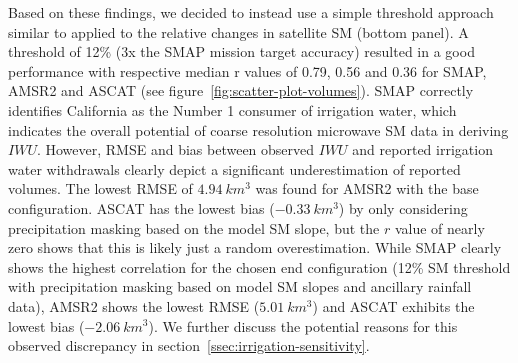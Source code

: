 \documentclass[hess, manuscript]{copernicus}
\begin{document}
Based on these findings, we decided to instead use a simple threshold approach similar to \citet{dorigo2013global} applied to the relative changes in satellite SM (bottom panel). A threshold of 12\% (3x the SMAP mission target accuracy) resulted in a good performance with respective median r values of 0.79, 0.56 and 0.36 for SMAP, AMSR2 and ASCAT (see figure~\ref{fig:scatter-plot-volumes}). SMAP correctly identifies California as the Number 1 consumer of irrigation water, which indicates the overall potential of coarse resolution microwave SM data in deriving $IWU$. However, RMSE and bias between observed $IWU$ and reported irrigation water withdrawals clearly depict a significant underestimation of reported volumes. The lowest RMSE of $4.94~km^{3}$ was found for AMSR2 with the base configuration. ASCAT has the lowest bias ($-0.33~km^{3}$) by only considering precipitation masking based on the model SM slope, but the $r$ value of nearly zero shows that this is likely just a random overestimation. While SMAP clearly shows the highest correlation for the chosen end configuration (12\% SM threshold with precipitation masking based on model SM slopes and ancillary rainfall data), AMSR2 shows the lowest RMSE ($5.01~km^{3}$) and ASCAT exhibits the lowest bias ($-2.06~km^{3}$). We further discuss the potential reasons for this observed discrepancy in section~\ref{ssec:irrigation-sensitivity}.

\end{document}
